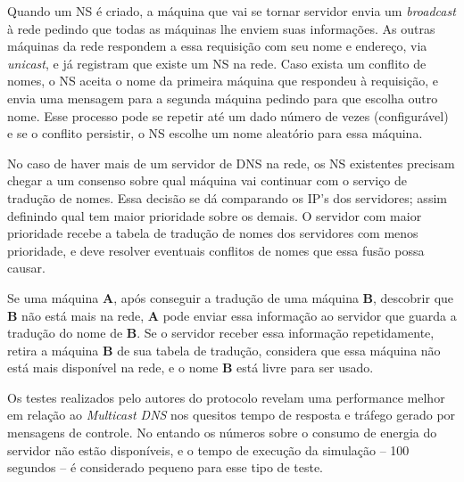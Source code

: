     Quando um NS é criado, a máquina que vai se tornar servidor envia um 
    \textit{broadcast} à rede pedindo que todas as máquinas lhe enviem suas 
    informações. As outras máquinas da rede respondem a essa requisição com seu 
    nome e endereço, via \textit{unicast}, e já registram que existe um NS na rede.
    Caso exista um conflito de nomes, o NS aceita o nome da primeira máquina que
    respondeu à requisição, e envia uma mensagem para a segunda máquina pedindo
    para que escolha outro nome. Esse processo pode se repetir até um dado número
    de vezes (configurável) e se o conflito persistir, o NS escolhe um nome 
    aleatório para essa máquina.
  
    No caso de haver mais de um servidor de DNS na rede, os NS existentes precisam
    chegar a um consenso sobre qual máquina vai continuar com o serviço de tradução
    de nomes. Essa decisão se dá comparando os IP's dos servidores; assim definindo
    qual tem maior prioridade sobre os demais. O servidor com maior prioridade recebe
    a tabela de tradução de nomes dos servidores com menos prioridade, e deve resolver
    eventuais conflitos de nomes que essa fusão possa causar.
  
    Se uma máquina \textbf{A}, após conseguir a tradução de uma máquina \textbf{B},
    descobrir que \textbf{B} não está mais na rede, \textbf{A} pode enviar essa 
    informação ao servidor que guarda a tradução do nome de \textbf{B}. Se o servidor
    receber essa informação repetidamente, retira a máquina \textbf{B} de sua 
    tabela de tradução, considera que essa máquina não está mais disponível na 
    rede, e o nome \textbf{B} está livre para ser usado.
  
    Os testes realizados pelo autores do protocolo revelam uma performance melhor
    em relação ao \textit{Multicast DNS} nos quesitos tempo de resposta e tráfego
    gerado por mensagens de controle. No entando os números sobre o consumo de 
    energia do servidor não estão disponíveis, e o tempo de execução da simulação
    -- 100 segundos -- é considerado pequeno para esse tipo de teste.